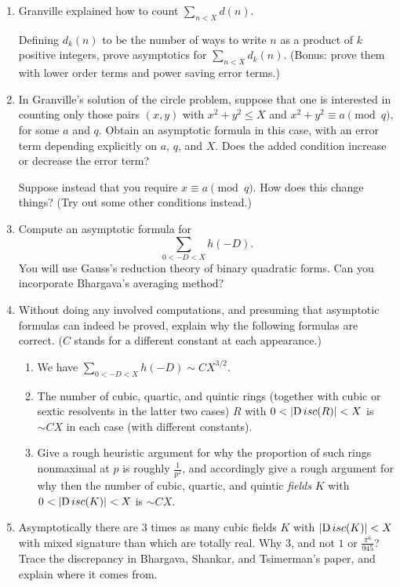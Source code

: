 \documentclass[12pt,amsfont]{amsart}
\begin{document}
\begin{enumerate}
\item
Granville explained how to count $\sum_{n < X} d(n)$.

Defining $d_k(n)$ to be the number of ways to write $n$ as a product of $k$ positive integers, prove asymptotics
for $\sum_{n < X} d_k(n)$. (Bonus: prove them with lower order terms and power saving error terms.)

\item
In Granville's solution of the circle problem, suppose that one is interested in counting only those pairs $(x, y)$ with
$x^2 + y^2 \leq X$ and $x^2 + y^2 \equiv a \pmod{q}$, for some $a$ and $q$. Obtain an asymptotic formula in this
case, with an error term depending explicitly on $a$, $q$, and $X$. Does the added condition increase or decrease the error term?

Suppose instead that you require $x \equiv a \pmod q$. How does this change things? (Try out some other conditions instead.)

\item
Compute an asymptotic formula for
\[
\sum_{0 < -D < X} h(-D).
\]
You will use Gauss's reduction theory of binary quadratic forms. Can you incorporate 
Bhargava's averaging method?

\item
Without doing any involved computations, and presuming that asymptotic formulas can indeed be proved, explain why the following formulas
are correct. ($C$ stands for a different constant at each appearance.)
\begin{enumerate}
\item We have
$\sum_{0 < -D < X} h(-D) \sim C X^{3/2}$.
\item The number of cubic, quartic, and quintic rings (together with cubic or sextic resolvents in the latter two cases) $R$ with
$0 < |{ {\operatorname Disc}}(R)| < X$ is $\sim C X$ in each case (with different constants).
\item Give a rough heuristic argument for why the proportion of such rings nonmaximal at $p$ is roughly $\frac{1}{p^2}$, and accordingly
give a rough argument for why then the number of cubic, quartic, and quintic {\itshape fields} $K$ with $0 < |{ {\operatorname Disc}}(K)| < X$ is 
$\sim CX$.
\end{enumerate}

\item
Asymptotically there are $3$ times as many cubic fields $K$ with $|{ {\operatorname Disc}}(K)| < X$ with mixed signature than which are totally
real. Why $3$, and not $1$ or $\frac{\pi^6}{945}$? Trace the discrepancy in Bhargava, Shankar, and Tsimerman's paper, and explain where it comes from.

\end{enumerate}
\end{document}
